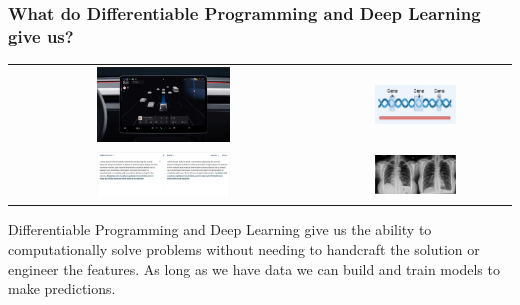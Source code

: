 \documentclass[]{article}
\begin{document}
\begin{frame}
\frametitle{What do Differentiable Programming and Deep Learning give us?}

\begin{center}
\begin{tabular}{cc}
\includegraphics[width=0.45\textwidth]{selfdriving.jpg} &
\includegraphics[width=0.45\textwidth]{gene.jpg} \\
\includegraphics[width=0.45\textwidth]{translation.jpg} &
\includegraphics[width=0.45\textwidth]{xray.jpg}
\end{tabular}
\end{center}

\end{frame}

Differentiable Programming and Deep Learning give us the ability to computationally solve problems without needing to handcraft the solution or engineer the features. As long as we have data we can build and train models to make predictions.
\end{document}
